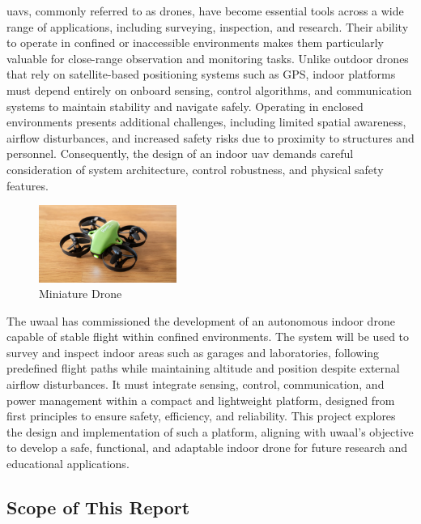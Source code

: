 \glspl{uav}, commonly referred to as drones, have become essential tools across a wide range of applications, including surveying, inspection, and research. Their ability to operate in confined or inaccessible environments makes them particularly valuable for close-range observation and monitoring tasks. Unlike outdoor drones that rely on satellite-based positioning systems such as GPS, indoor platforms must depend entirely on onboard sensing, control algorithms, and communication systems to maintain stability and navigate safely. Operating in enclosed environments presents additional challenges, including limited spatial awareness, airflow disturbances, and increased safety risks due to proximity to structures and personnel. Consequently, the design of an indoor \gls{uav} demands careful consideration of system architecture, control robustness, and physical safety features. 

\begin{figure}[H]
    \centering
    \captionsetup{justification=centering, margin=1cm}
    \includegraphics[width=0.4\textwidth]{img/mini-drone.JPG}
    \caption{Miniature Drone \cite{abbott2024}}
\end{figure}

The \gls{uwaal} has commissioned the development of an autonomous indoor drone capable of stable flight within confined environments. The system will be used to survey and inspect indoor areas such as garages and laboratories, following predefined flight paths while maintaining altitude and position despite external airflow disturbances. It must integrate sensing, control, communication, and power management within a compact and lightweight platform, designed from first principles to ensure safety, efficiency, and reliability. This project explores the design and implementation of such a platform, aligning with \gls{uwaal}’s objective to develop a safe, functional, and adaptable indoor drone for future research and educational applications. 

\subsection{Scope of This Report}

